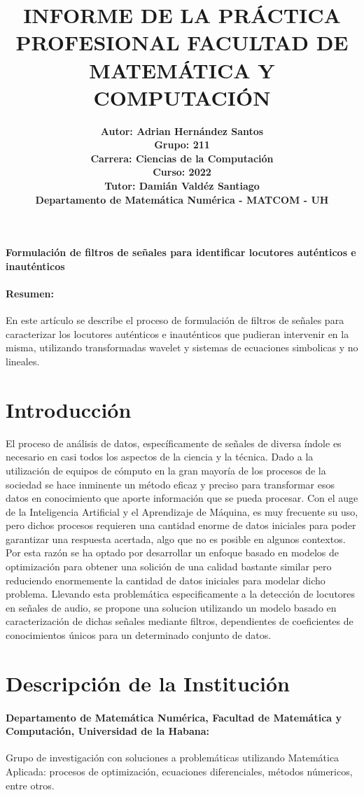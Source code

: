 \documentclass[11pt]{article}
\title{INFORME DE LA PRÁCTICA PROFESIONAL 
FACULTAD DE MATEMÁTICA Y COMPUTACIÓN}
\author{
    \bf {Autor: Adrian Hernández Santos}\\
    \bf {Grupo: 211}\\
    \bf {Carrera: Ciencias de la Computación}\\
    \bf {Curso: 2022}\\
    \bf {Tutor: Damián Valdéz Santiago}\\
    \bf {Departamento de Matemática Numérica - MATCOM - UH}
}
\date{}
\begin{document}
\maketitle

\vfill
{
    \centering
    {
        \Large{\bf {Formulación de filtros de señales para identificar locutores auténticos e inauténticos}}
    }
}

\paragraph*{Resumen:} En este artículo se describe el proceso de formulación de filtros de señales para caracterizar 
los locutores auténticos e inauténticos que pudieran intervenir en la misma, utilizando transformadas wavelet y 
sistemas de ecuaciones simbolicas y no lineales.

\clearpage

\section*{Introducción}
El proceso de análisis de datos, específicamente de señales de diversa índole es necesario en casi todos los aspectos 
de la ciencia y la técnica. Dado a la utilización de equipos de cómputo en la gran mayoría de los procesos de la sociedad 
se hace inminente un método eficaz y preciso para transformar esos datos en conocimiento que aporte información que se pueda 
procesar. Con el auge de la Inteligencia Artificial y el Aprendizaje de Máquina, es muy frecuente su uso, pero dichos procesos requieren una cantidad enorme 
de datos iniciales para poder garantizar una respuesta acertada, algo que no es posible en algunos contextos. Por esta razón 
se ha optado por desarrollar un enfoque basado en modelos de optimización para obtener una solición de una calidad bastante similar 
pero reduciendo enormemente la cantidad de datos iniciales para modelar dicho problema. Llevando esta problemática especificamente 
a la detección de locutores en señales de audio, se propone una solucion utilizando un modelo basado en caracterización de 
dichas señales mediante filtros, dependientes de coeficientes de conocimientos únicos para un determinado conjunto de datos.

\clearpage

\section*{Descripción de la Institución}
\paragraph*{Departamento de Matemática Numérica, Facultad de Matemática y Computación, Universidad de la Habana:}
Grupo de investigación con soluciones a problemáticas utilizando Matemática Aplicada: procesos de optimización, ecuaciones diferenciales, métodos númericos, entre otros.
\end{document}
